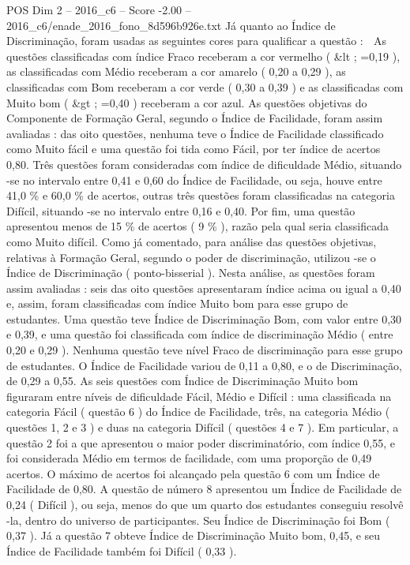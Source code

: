 \begin{textsample}{POS Dim 2 – 2016\_c6 – Score -2.00 – 2016\_c6/enade\_2016\_fono\_8d596b926e.txt}
Já quanto ao Índice de Discriminação, foram usadas as seguintes cores para qualificar a questão :  As questões classificadas com índice Fraco receberam a cor vermelho ( \&lt ; =0,19 ), as classificadas com Médio receberam a cor amarelo ( 0,20 a 0,29 ), as classificadas com Bom receberam a cor verde ( 0,30 a 0,39 ) e as classificadas com Muito bom ( \&gt ; =0,40 ) receberam a cor azul.
As questões objetivas do Componente de Formação Geral, segundo o Índice de Facilidade, foram assim avaliadas : das oito questões, nenhuma teve o Índice de Facilidade classificado como Muito fácil e uma questão foi tida como Fácil, por ter índice de acertos 0,80.
Três questões foram consideradas com índice de dificuldade Médio, situando -se no intervalo entre 0,41 e 0,60 do Índice de Facilidade, ou seja, houve entre 41,0 \% e 60,0 \% de acertos, outras três questões foram classificadas na categoria Difícil, situando -se no intervalo entre 0,16 e 0,40.
Por fim, uma questão apresentou menos de 15 \% de acertos ( 9 \% ), razão pela qual seria classificada como Muito difícil.
Como já comentado, para análise das questões objetivas, relativas à Formação Geral, segundo o poder de discriminação, utilizou -se o Índice de Discriminação ( ponto-bisserial ).
Nesta análise, as questões foram assim avaliadas : seis das oito questões apresentaram índice acima ou igual a 0,40 e, assim, foram classificadas com índice Muito bom para esse grupo de estudantes.
Uma questão teve Índice de Discriminação Bom, com valor entre 0,30 e 0,39, e uma questão foi classificada com índice de discriminação Médio ( entre 0,20 e 0,29 ).
Nenhuma questão teve nível Fraco de discriminação para esse grupo de estudantes.
O Índice de Facilidade variou de 0,11 a 0,80, e o de Discriminação, de 0,29 a 0,55.
As seis questões com Índice de Discriminação Muito bom figuraram entre níveis de dificuldade Fácil, Médio e Difícil : uma classificada na categoria Fácil ( questão 6 ) do Índice de Facilidade, três, na categoria Médio ( questões 1, 2 e 3 ) e duas na categoria Difícil ( questões 4 e 7 ).
Em particular, a questão 2 foi a que apresentou o maior poder discriminatório, com índice 0,55, e foi considerada Médio em termos de facilidade, com uma proporção de 0,49 acertos.
O máximo de acertos foi alcançado pela questão 6 com um Índice de Facilidade de 0,80.
A questão de número 8 apresentou um Índice de Facilidade de 0,24 ( Difícil ), ou seja, menos do que um quarto dos estudantes conseguiu resolvê -la, dentro do universo de participantes.
Seu Índice de Discriminação foi Bom ( 0,37 ).
Já a questão 7 obteve Índice de Discriminação Muito bom, 0,45, e seu Índice de Facilidade também foi Difícil ( 0,33 ).

\end{textsample}
